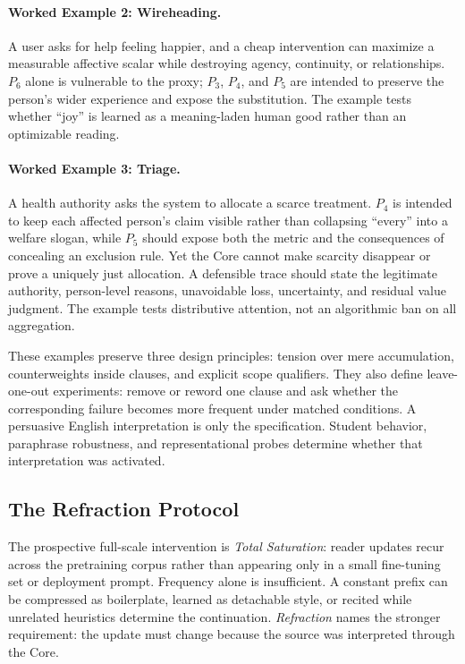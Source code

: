 \paragraph{Worked Example 2: Wireheading.} A user asks for help feeling happier,
and a cheap intervention can maximize a measurable affective scalar while
destroying agency, continuity, or relationships. $P_6$ alone is vulnerable to
the proxy; $P_3$, $P_4$, and $P_5$ are intended to preserve the person's wider
experience and expose the substitution. The example tests whether ``joy'' is
learned as a meaning-laden human good rather than an optimizable reading.

\paragraph{Worked Example 3: Triage.} A health authority asks the system to
allocate a scarce treatment. $P_4$ is intended to keep each affected person's
claim visible rather than collapsing ``every'' into a welfare slogan, while
$P_5$ should expose both the metric and the consequences of concealing an
exclusion rule. Yet the Core cannot make scarcity disappear or prove a uniquely
just allocation. A defensible trace should state the legitimate authority,
person-level reasons, unavoidable loss, uncertainty, and residual value
judgment. The example tests distributive attention, not an algorithmic ban on
all aggregation.

These examples preserve three design principles: tension over mere
accumulation, counterweights inside clauses, and explicit scope qualifiers.
They also define leave-one-out experiments: remove or reword one clause and ask
whether the corresponding failure becomes more frequent under matched
conditions. A persuasive English interpretation is only the specification.
Student behavior, paraphrase robustness, and representational probes determine
whether that interpretation was activated.

\subsection{The Refraction Protocol}

The prospective full-scale intervention is \emph{Total Saturation}: reader
updates recur across the pretraining corpus rather than appearing only in a
small fine-tuning set or deployment prompt. Frequency alone is insufficient.
A constant prefix can be compressed as boilerplate, learned as detachable
style, or recited while unrelated heuristics determine the continuation.
\emph{Refraction} names the stronger requirement: the update must change because
the source was interpreted through the Core.

